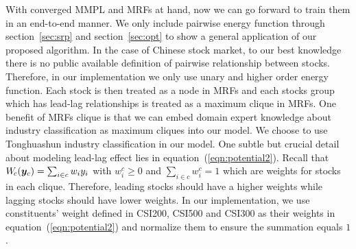 With converged MMPL and MRFs at hand, now we can go forward to
train them in an end-to-end manner. We only include pairwise
energy function through section~\ref{sec:srp} and
section~\ref{sec:opt} to show a general application of our
proposed algorithm. In the case of Chinese stock market, to our
best knowledge there is no public available definition of
pairwise relationship between stocks. Therefore, in our
implementation we only use unary and higher order energy
function. Each stock is then treated as a node in MRFs and each
stocks group which has lead-lag relationships is treated as a
maximum clique in MRFs. One benefit of MRFs clique is that we can
embed domain expert knowledge about industry classification as
maximum cliques into our model. We choose to use Tonghuashun
industry classification \cite{ths} in our model. One subtle but
crucial detail about modeling lead-lag effect lies in
equation~(\ref{eqn:potential2}). Recall that $W_{\!c}({\bm{y}}_c) =
\sum_{i \in c} w_i y_i$ with $w^c_i \geq 0$ and $\sum_{i \in c}
w^c_i = 1$ which are weights for stocks in each clique.
Therefore, leading stocks should have a higher weights while
lagging stocks should have lower weights. In our implementation,
we use constituents' weight defined in CSI200, CSI500 and CSI300
as their weights in equation~(\ref{eqn:potential2}) and normalize
them to ensure the summation equals $1$.


